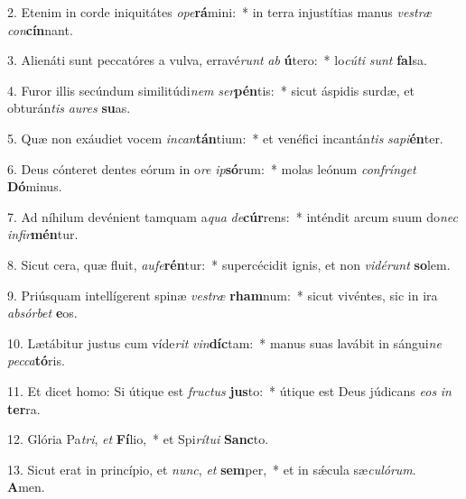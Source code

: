 2. Etenim in corde iniquitátes \textit{o}\textit{pe}\textbf{rá}mini:~*  in terra injustítias manus \textit{ves}\textit{træ} \textit{con}\textbf{cín}nant.\

3. Alienáti sunt peccatóres a vulva, erravé\textit{runt} \textit{ab} \textbf{ú}tero:~*  lo\textit{cú}\textit{ti} \textit{sunt} \textbf{fal}sa.\

4. Furor illis secúndum similitúdi\textit{nem} \textit{ser}\textbf{pén}tis:~*  sicut áspidis surdæ, et obturán\textit{tis} \textit{au}\textit{res} \textbf{su}as.\

5. Quæ non exáudiet vocem \textit{in}\textit{can}\textbf{tán}tium:~*  et venéfici incantán\textit{tis} \textit{sa}\textit{pi}\textbf{én}ter.\

6. Deus cónteret dentes eórum in o\textit{re} \textit{ip}\textbf{só}rum:~*  molas leónum \textit{con}\textit{frín}\textit{get} \textbf{Dó}minus.\

7. Ad níhilum devénient tamquam a\textit{qua} \textit{de}\textbf{cúr}rens:~*  inténdit arcum suum do\textit{nec} \textit{in}\textit{fir}\textbf{mén}tur.\

8. Sicut cera, quæ fluit, \textit{au}\textit{fe}\textbf{rén}tur:~*  supercécidit ignis, et non \textit{vi}\textit{dé}\textit{runt} \textbf{so}lem.\

9. Priúsquam intellígerent spinæ \textit{ves}\textit{træ} \textbf{rham}num:~*  sicut vivéntes, sic in ira \textit{ab}\textit{sór}\textit{bet} \textbf{e}os.\

10. Lætábitur justus cum víde\textit{rit} \textit{vin}\textbf{díc}tam:~*  manus suas lavábit in sángui\textit{ne} \textit{pec}\textit{ca}\textbf{tó}ris.\

11. Et dicet homo: Si útique est \textit{fruc}\textit{tus} \textbf{jus}to:~*  útique est Deus júdicans \textit{e}\textit{os} \textit{in} \textbf{ter}ra.\

12. Glória Pa\textit{tri}, \textit{et} \textbf{Fí}lio,~*  et Spi\textit{rí}\textit{tu}\textit{i} \textbf{Sanc}to.\

13. Sicut erat in princípio, et \textit{nunc}, \textit{et} \textbf{sem}per,~*  et in sǽcula sæ\textit{cu}\textit{ló}\textit{rum}. \textbf{A}men.\

